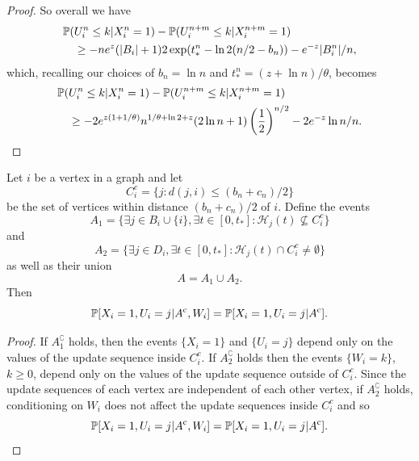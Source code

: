 \begin{proof}
		So overall we have
		\begin{align}
			\mathbb{P}(&U_i^n \leq k | X_i^n = 1) - \mathbb{P}(U_i^{n+m} \leq k | X_i^{n+m} = 1) \notag \\ 
			&\geq - n e^{z} (|B_i| + 1) 2\exp(t_*^n - \ln 2 (n/2 - b_n)) - e^{-z} |B_i^n| / n,
		\end{align}
		which, recalling our choices of $b_n = \ln n$ and $t_*^n = (z + \ln n) / \theta$, becomes
		\begin{align}
			\mathbb{P}(&U_i^n \leq k | X_i^n = 1) - \mathbb{P}(U_i^{n+m} \leq k | X_i^{n+m} = 1) \notag \\ 
			&\geq - 2 e^{z(1 + 1/\theta)} n^{1/\theta + \ln 2 + z}(2\ln n + 1) \left(\frac{1}{2}\right)^{n/2} - 2 e^{-z} \ln n / n.
		\end{align}

	\end{proof}
	
	

	\begin{lemma}
	\label{lem:conditioning on A removes conditioning on W}
		Let $i$ be a vertex in a graph and let
		\begin{equation}
			C_i^c = \{j : d(j, i) \leq (b_n + c_n)/2\}
		\end{equation}
		be the set of vertices within distance $(b_n + c_n)/2$ of $i$. Define the events
		\begin{equation}
			A_1 = \{\exists j \in B_i \cup \{i\}, \exists t \in [0, t_*] : \mathcal{H}_j(t) \nsubseteq  C_i^c\}
		\end{equation}
		and
		\begin{equation}
			A_2 = \{\exists j \in D_i, \exists t \in [0, t_*] : \mathcal{H}_j(t) \cap C_i^c \neq \emptyset\}
		\end{equation}
		as well as their union
		\begin{equation}
			A = A_1 \cup A_2.
		\end{equation}
		Then
		\begin{equation}
			\mathbb{P}[X_i = 1, U_i = j | A^{\mathrm{c}}, W_i] = \mathbb{P}[X_i = 1, U_i = j | A^{\mathrm{c}}].
		\end{equation}
	\end{lemma}
	\begin{proof}
		If $A_1^\complement$ holds, then the events $\{X_i = 1\}$ and $\{U_i = j\}$ depend only on the values of the update sequence inside $C_i^c$. If $A_2^\complement$ holds then the events $\{W_i = k\}$, $k \geq 0$, depend only on the values of the update sequence outside of $C_i^c$. Since the update sequences of each vertex are independent of each other vertex, if $A_2^\complement$ holds, conditioning on $W_i$ does not affect the update sequences inside $C_i^c$ and so 
		\begin{equation}
			\mathbb{P}[X_i = 1, U_i = j | A^{\mathrm{c}}, W_i] = \mathbb{P}[X_i = 1, U_i = j | A^{\mathrm{c}}].
		\end{equation}
	\end{proof}

